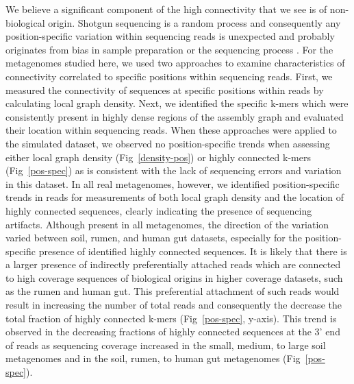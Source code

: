 \documentclass[10pt]{article}
\begin{document}

We believe a significant component of the high connectivity that we
see is of non-biological origin.  Shotgun sequencing is a random
process and consequently any position-specific variation within
sequencing reads is unexpected and probably originates from bias in
sample preparation or the sequencing process \cite{GomezAlvarez:2009p1334, Haas:2011jg, Keegan:2012p1336}.
For the
metagenomes studied here, we used two approaches to examine
characteristics of connectivity correlated to specific positions
within sequencing reads.  First, we measured the connectivity of
sequences at specific positions within reads by calculating local
graph density.  Next, we identified the specific k-mers which were
consistently present in highly dense regions of the assembly graph and
evaluated their location within sequencing reads.  When these
approaches were applied to the simulated dataset, we observed no
position-specific trends when assessing either local graph density
(Fig~\ref{density-pos}) or highly connected k-mers (Fig~\ref{pos-spec}) as is
consistent with the lack of sequencing errors and variation in this
dataset.  In all real metagenomes, however, we identified
position-specific trends in reads for measurements of both local graph density
and the location of highly connected sequences, clearly indicating the
presence of sequencing artifacts.  Although present in all
metagenomes, the direction of the variation varied between soil,
rumen, and human gut datasets, especially for the position-specific
presence of identified highly connected sequences.  It is likely that
there is a larger presence of indirectly preferentially attached reads
which are connected to high coverage sequences of biological origins
in higher coverage datasets, such as the rumen and human gut.  This
preferential attachment of such reads would result in increasing the
number of total reads and consequently the decrease the total fraction
of highly connected k-mers (Fig~\ref{pos-spec}, y-axis).  This trend is observed
in the decreasing fractions of highly connected sequences at the 3'
end of reads as sequencing coverage increased in the small, medium, to
large soil metagenomes and in the soil, rumen, to human gut
metagenomes (Fig~\ref{pos-spec}).
\end{document}
